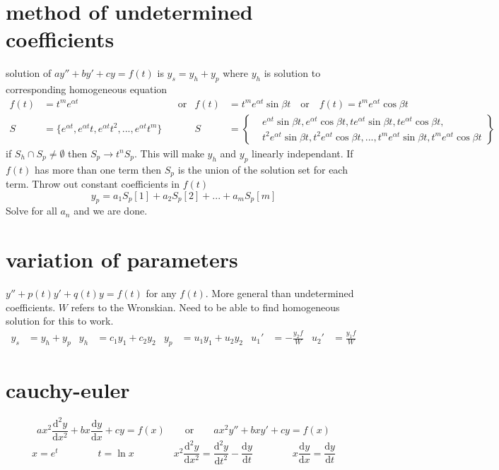 \documentclass{article}
\begin{document}
\section*{method of undetermined coefficients}
solution of $ay''+by'+cy=f(t)$ is $y_s=y_h+y_p$ where $y_h$ is solution to corresponding homogeneous equation
\begin{align*}
	f(t)&=t^me^{\alpha t} &&\text{or}& f(t)&=t^me^{\alpha t}\sin \beta t  \quad\text{or}\quad f(t)=t^me^{\alpha t}\cos \beta t\\
	S&=\{e^{\alpha t},e^{\alpha t}t,e^{\alpha t}t^2,...,e^{\alpha t}t^m\} &&&
	S&=\left\{
	\begin{aligned}
		&e^{\alpha t}\sin\beta t,e^{\alpha t}\cos\beta t,
		te^{\alpha t}\sin\beta t,te^{\alpha t}\cos\beta t,\\
		&t^2e^{\alpha t}\sin\beta t, t^2e^{\alpha t}\cos\beta t,...,
		t^me^{\alpha t}\sin\beta t,t^me^{\alpha t}\cos\beta t
	\end{aligned}
	\right\}
\end{align*}
if $S_h\cap S_p\neq\emptyset$ then $S_p\rightarrow t^nS_p$. This will make $y_h$ and $y_p$ linearly independant. If $f(t)$ has more than one term then $S_p$ is the union of the solution set for each term. Throw out constant coefficients in $f(t)$
\[y_p=a_1S_p[1]+a_2S_p[2]+...+a_mS_p[m]\]
Solve for all $a_n$ and we are done.

\section*{variation of parameters}
$y''+p(t)y'+q(t)y=f(t)$ for any $f(t)$. More general than undetermined coefficients. $W$ refers to the Wronskian. Need to be able to find homogeneous solution for this to work.
\begin{align*}
	y_s&=y_h+y_p & y_h&=c_1y_1+c_2y_2 & y_p&=u_1y_1+u_2y_2 & {u_1}'&=-\frac{y_2f}{W} & {u_2}'&=\frac{y_1f}{W}
\end{align*}

\section*{cauchy-euler}
\[ax^2 \frac{\mathrm{d}^2y}{\mathrm{d}x^2}+bx\frac{\mathrm{d}y}{\mathrm{d}x}+cy=f(x) \qquad\text{or}\qquad ax^2y''+bxy'+cy=f(x)\]
\[x=e^t \qquad\qquad t=\ln x \qquad\qquad x^2 \frac{\mathrm{d}^2y}{\mathrm{d}x^2}=\frac{\mathrm{d}^2y}{\mathrm{d}t^2}-\frac{\mathrm{d}y}{\mathrm{d}t} \qquad\qquad x\frac{\mathrm{d}y}{\mathrm{d}x}=\frac{\mathrm{d}y}{\mathrm{d}t}\]
\end{document}
